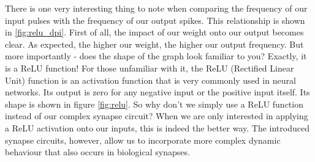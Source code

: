 
There is one very interesting thing to note when comparing the frequency of our input pulses with the frequency of our output spikes. This relationship is shown in \ref{fig:relu_dpi}. First of all, the impact of our weight onto our output becomes clear. As expected, the higher our weight, the higher our output frequency. But more importantly - does the shape of the graph look familiar to you? Exactly, it is a ReLU function! For those unfamiliar with it, the ReLU (Rectified Linear Unit) function is an activation function that is very commonly used in neural networks. Its output is zero for any negative input or the positive input itself. Its shape is shown in figure \ref{fig:relu}. So why don't we simply use a ReLU function instead of our complex synapse circuit? When we are only interested in applying a ReLU activation onto our inputs, this is indeed the better way. The introduced synapse circuits, however, allow us to incorporate more complex dynamic behaviour that also occurs in biological synapses.